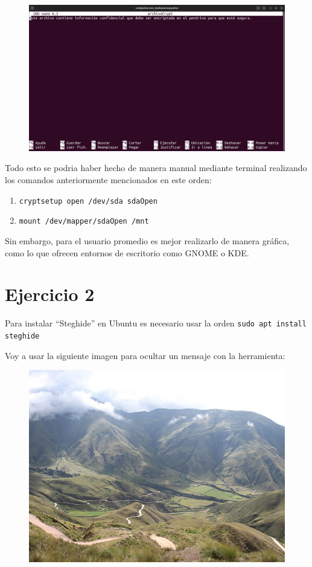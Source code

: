 \documentclass{article}
\begin{document}
\begin{figure}[H]
    \includegraphics[width=\textwidth]{imagenes/Captura desde 2022-10-30 11-05-44.png}
\end{figure}

Todo esto se podria haber hecho de manera manual mediante terminal realizando los comandos anteriormente mencionados en este orden:

\begin{enumerate}
    \item \verb|cryptsetup open /dev/sda sdaOpen|
    \item \verb|mount /dev/mapper/sdaOpen /mnt|
\end{enumerate}

Sin embargo, para el usuario promedio es mejor realizarlo de manera gráfica, como lo que ofrecen entornos de escritorio como GNOME o KDE.

\section*{Ejercicio 2}

Para instalar ``Steghide'' en Ubuntu es necesario usar la orden \verb|sudo apt install steghide|

Voy a usar la siguiente imagen para ocultar un mensaje con la herramienta:

\begin{figure}[H]
    \includegraphics[width=\textwidth]{imagenes/imagen.jpg}
\end{figure}
\end{document}
